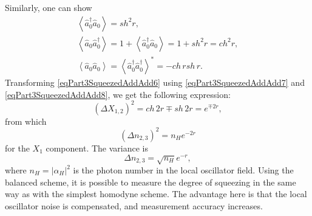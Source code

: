 Similarly, one can show
\begin{eqnarray}
\left<\hat{a}_0^{\dag}\hat{a}_0\right> = sh^2 r,
\nonumber \\
\left<\hat{a}_0\hat{a}_0^{\dag}\right> = 
1 + \left<\hat{a}_0^{\dag}\hat{a}_0\right> =
1 + sh^2 r = ch^2 r,
\nonumber \\
\left<\hat{a}_0\hat{a}_0\right> = 
\left<\hat{a}_0^{\dag}\hat{a}_0^{\dag}\right>^{*} = - ch\,r sh\,r.
\label{eqPart3SqueezedAddAdd8}
\end{eqnarray}
Transforming \eqref{eqPart3SqueezedAddAdd6} using
\eqref{eqPart3SqueezedAddAdd7}
and
\eqref{eqPart3SqueezedAddAdd8},
we get the following expression:
\begin{equation}
\left(\Delta X_{1,2}\right)^2 = 
ch\,2 r \mp sh\, 2 r = 
e^{\mp 2 r},
\nonumber
\end{equation}
from which
\begin{equation}
\left(\Delta n_{2,3}\right)^2 = 
n_H
e^{- 2 r}
\nonumber
\end{equation}
for the $X_1$ component. The variance is
\[
\Delta n_{2,3} = 
\sqrt{n_H}
e^{- r},
\]
where $n_H = \left|\alpha_H\right|^2$ is the photon number in the local oscillator field.
Using the balanced scheme, it is possible to measure the degree of squeezing in the same way as with the simplest homodyne scheme. The advantage here is that the local oscillator noise is compensated, and measurement accuracy increases.